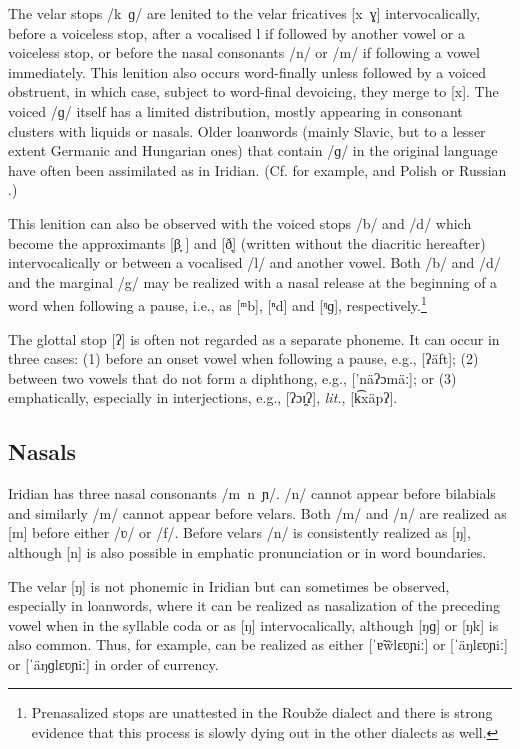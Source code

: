 The velar stops /k~ɡ/ are lenited to the velar fricatives [x~ɣ]
intervocalically, before a voiceless stop, after a vocalised l if followed by
another vowel or a voiceless stop, or before the nasal consonants /n/ or /m/ if
following a vowel immediately. This lenition also occurs word-finally unless
followed by a voiced obstruent, in which case, subject to word-final devoicing,
they merge to [x]. The voiced /ɡ/ itself has a limited distribution, mostly
appearing in consonant clusters with liquids or nasals. Older loanwords (mainly
Slavic, but to a lesser extent Germanic and Hungarian ones) that contain /ɡ/ in
the original language have often been assimilated as  in Iridian. (Cf.
for example,  and Polish  or Russian
.)

This lenition can also be observed with the voiced stops /b/ and /d/ which
become the approximants [β̞	] and [ð̞] (written without the diacritic hereafter)
intervocalically or between a vocalised /l/ and another vowel. Both /b/ and /d/
and the marginal /g/ may be realized with a nasal release at the beginning of a
word when following a pause, i.e., as [ᵐb], [ⁿd] and [ᵑɡ],
respectively.\footnote{Prenasalized stops are unattested in the Roubže dialect
and there is strong evidence that this process is slowly dying out in the other
dialects as well.} 

The glottal stop [ʔ] is often not regarded as a separate phoneme. It can occur
in three cases: (1) before an onset vowel when following a pause, e.g.,
 [ʔäft]; (2) between two vowels that do not form a diphthong,
e.g.,  ['näʔɔmäː]; or (3) emphatically, especially in
interjections, e.g.,  [ʔɔɪ̯ʔ], 
\emph{lit.},  [k͡xäpʔ].

\subsection{Nasals}
Iridian has three nasal consonants /m~n~ɲ/. /n/ cannot appear before bilabials
and similarly /m/ cannot appear before velars. Both /m/ and /n/ are realized as
[m] before either /ʋ/ or /f/. Before velars /n/ is consistently realized as [ŋ],
although [n] is also possible in emphatic pronunciation or in word boundaries.

The velar [ŋ] is not phonemic in Iridian but can sometimes be observed,
especially in loanwords, where it can be realized as nasalization of the
preceding vowel when in the syllable coda or as [ŋ] intervocalically, although
[ŋɡ] or [ŋk] is also common. Thus, for example,  can be
realized as either [ˈɐ̃w̃lɛʋɲiː] or [ˈäŋlɛʋɲiː] or [ˈäŋɡlɛʋɲiː] in order of
currency.

